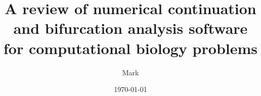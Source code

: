 \documentclass[a4paper,twoside]{article}
\author{Mark}
\date{\today}
\title{A review of numerical continuation and bifurcation analysis software for computational biology problems}
\newenvironment{NOTE}{\color{red}\bfseries ZZZ}
\begin{document}
\maketitle
\begin{NOTE}
Currently c.3000 words, 47 refs.
Cell systems has a review word limit of 8000 words, 100 refs.


TODO come up with a less verbose title

Perhaps send the preprint to whoever wrote each of the tools, to make sure I haven't missed anything / got anything wrong?
\end{NOTE}

\section{{\bfseries\sffamily TODO} Abstract}
\label{sec:org64c599d}
\begin{abstract}
\end{abstract}


\section{{\bfseries\sffamily TODO} Introduction to bifurcation analysis}
\label{sec:org20f845f}
\subsection{{\bfseries\sffamily TODO} : PROOF READ; [intro, remove this header]}
\label{sec:org60b5f17}

Computational biology uses mathematical tools to understand the processes that give rise to living organisms \cite{beard2005computational}.
One area having seen significant success is the application of ideas from nonlinear dynamics and dynamical systems theory to biological systems.
Here, processes are described in terms of differential equations, which describe how some aspect of interest evolves in time; an introduction to the field can be found in \cite{strogatz2018nonlinear,guckenheimer2013nonlinear}.
The resulting equations can be analysed both to explain observed phenomena, and to predict novel, unseen behaviours.
Classic examples of this are the work of Hodgkin and Huxley \cite{hodgkin1952quantitative}, which laid the foundations for classical neuroscience; the Mackey-Glass equation \cite{mackey1977oscillation}, which studies the effects of time-delayed feedback on respiratory and hematopoietic diseases; and the Lotka-Volterra model \cite{volterra1928variations} of population dynamics.
\end{document}
